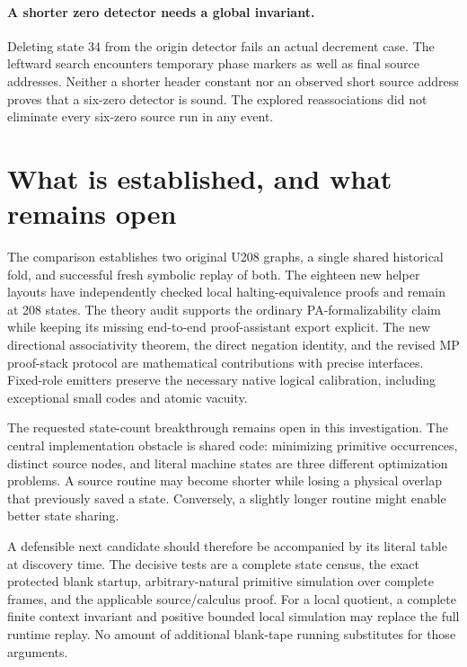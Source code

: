 \documentclass[11pt,a4paper]{article}
\begin{document}
\paragraph{A shorter zero detector needs a global invariant.}
Deleting state 34 from the origin detector fails an actual decrement case.
The leftward search encounters temporary phase markers as well as final
source addresses. Neither a shorter header constant nor an observed short
source address proves that a six-zero detector is sound. The explored
reassociations did not eliminate every six-zero source run in any event.

\section{What is established, and what remains open}

The comparison establishes two original U208 graphs, a single shared
historical fold, and successful fresh symbolic replay of both. The eighteen
new helper layouts have independently checked local halting-equivalence
proofs and remain at 208 states. The theory audit supports the
ordinary PA-formalizability claim while keeping its missing end-to-end
proof-assistant export explicit. The new directional associativity theorem,
the direct negation identity, and the revised MP proof-stack protocol are
mathematical contributions with precise interfaces. Fixed-role emitters
preserve the necessary native logical calibration, including exceptional
small codes and atomic vacuity.

The requested state-count breakthrough remains open in this investigation.
The central implementation obstacle is shared code: minimizing primitive
occurrences, distinct source nodes, and literal machine states are three
different optimization problems. A source routine may become shorter while
losing a physical overlap that previously saved a state. Conversely, a
slightly longer routine might enable better state sharing.

A defensible next candidate should therefore be accompanied by its literal
table at discovery time. The decisive tests are a complete state census,
the exact protected blank startup, arbitrary-natural primitive simulation
over complete frames, and the applicable source/calculus proof. For a local
quotient, a complete finite context invariant and positive bounded local
simulation may replace the full runtime replay. No amount of additional
blank-tape running substitutes for those arguments.
\end{document}
